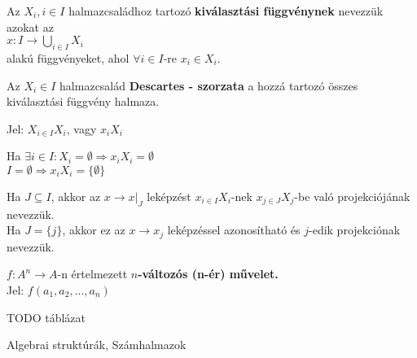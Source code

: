 \documentclass{beamer}
\newcommand{\mmedskip}{\vspace{0.5em}}
\begin{document}
\begin{frame}
\begin{tcolorbox}[title={Def.: Kiválasztási függvény, Halmazcsalád Descartes-szorzata}]
Az $X_i, i \in I$ halmazcsaládhoz tartozó \textbf{kiválasztási függvénynek} nevezzük azokat az\\
$x : I \rightarrow {\bigcup}_{i \in I} X_i$\\
alakú függvényeket, ahol ${\forall} i \in I$-re $x_i \in X_i$.\\
\mmedskip

Az $X_i \in I$ halmazcsalád \textbf{Descartes - szorzata} a hozzá tartozó összes kiválasztási függvény halmaza.\\
\mmedskip

Jel: $X_{i \in I} X_i$, vagy $x_iX_i$
\end{tcolorbox}

\begin{tcolorbox}[title={Ész}]
Ha ${\exists} i \in I : X_i = \emptyset \Rightarrow x_iX_i = \emptyset$\\
$I = \emptyset \Rightarrow x_iX_i = \{ \emptyset \}$
\end{tcolorbox}

\begin{tcolorbox}[title={Def.: Leképzás $j$-edik projekciója}]
Ha $J \subseteq I$, akkor az $x \rightarrow x|_J$ leképzést $x_{i \in I}X_i$-nek $x_{j \in J}X_j$-be való projekciójának nevezzük.\\
Ha $J = \{ j \}$, akkor ez az $x \rightarrow x_j$ leképzéssel azonosítható és $j$-edik projekciónak nevezzük.
\end{tcolorbox}
\end{frame}

\begin{frame}

\begin{tcolorbox}[title={Def.: $n$-változós művelet}]
$f : A^n \rightarrow A$-n értelmezett \textbf{$n$-változós (n-ér) művelet.}\\
Jel: $f(a_1, a_2, ..., a_n)$
\end{tcolorbox}

\begin{tcolorbox}[title={Def.: Műveleti tábla, Operandus}]
TODO táblázat
\end{tcolorbox}
\end{frame}


\begin{frame}[plain]
\begin{tcolorbox}[center, colback={myyellow}, coltext={black}, colframe={myyellow}]
    {\Huge Algebrai struktúrák, Számhalmazok}
    \mmedskip
\end{tcolorbox}
\end{frame}
\end{document}
